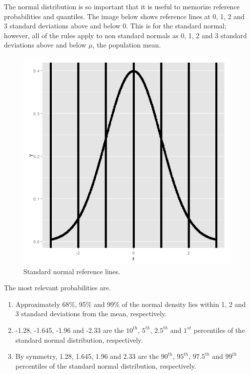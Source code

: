 \documentclass[]{article}
\begin{document}
The normal distribution is so important that it is useful to memorize
reference probabilities and quantiles. The image below shows reference
lines at 0, 1, 2 and 3 standard deviations above and below 0. This is
for the standard normal; however, all of the rules apply to non standard
normals as 0, 1, 2 and 3 standard deviations above and below $\mu$, the
population mean.

\begin{figure}[htbp]
\centering
\includegraphics{LeanPub/images/normalReference-1.png}
\caption{Standard normal reference lines.}
\end{figure}

The most relevant probabilities are.

\begin{enumerate}
\def\labelenumi{\arabic{enumi}.}
\itemsep1pt\parskip0pt
\item
  Approximately 68\%, 95\% and 99\% of the normal density lies within 1,
  2 and 3 standard deviations from the mean, respectively.
\item
  -1.28, -1.645, -1.96 and -2.33 are the $10^{th}$, $5^{th}$, $2.5^{th}$
  and $1^{st}$ percentiles of the standard normal distribution,
  respectively.
\item
  By symmetry, 1.28, 1.645, 1.96 and 2.33 are the $90^{th}$, $95^{th}$,
  $97.5^{th}$ and $99^{th}$ percentiles of the standard normal
  distribution, respectively.
\end{enumerate}
\end{document}
